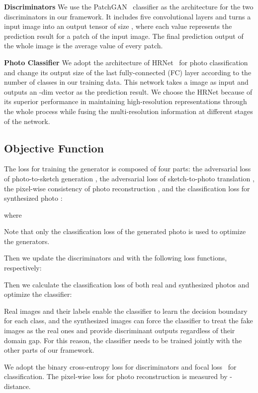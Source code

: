 \documentclass[10pt,twocolumn,letterpaper]{article}
\begin{document}
\noindent \textbf{Discriminators} We use the PatchGAN~\cite{li2016precomputed,ledig2017photo} classifier as the architecture for the two discriminators in our framework. It includes five convolutional layers and turns a  input image into an output tensor of size , where each value represents the prediction result for a  patch of the input image. The final prediction output of the whole image is the average value of every patch.

\noindent \textbf{Photo Classifier} We adopt the architecture of HRNet~\cite{wang2020deep} for photo classification and change its output size of the last fully-connected (FC) layer according to the number of classes in our training data. This network takes a  image as input and outputs an -dim vector as the prediction result. We choose the HRNet because of its superior performance in maintaining high-resolution representations through the whole process while fusing the multi-resolution information at different stages of the network.

\subsection{Objective Function} 
\label{sec:obj}
The loss for training the generator is composed of four parts: the adversarial loss of photo-to-sketch generation , the adversarial loss of sketch-to-photo translation , the pixel-wise consistency of photo reconstruction , and the classification loss for synthesized photo :


\noindent where 





Note that only the classification loss of the generated photo  is used to optimize the generators. 

Then we update the discriminators  and  with the following loss functions, respectively:



Then we calculate the classification loss of both real and synthesized photos and optimize the classifier:


Real images and their labels enable the classifier to learn the decision boundary for each class, and the synthesized images can force the classifier to treat the fake images as the real ones and provide discriminant outputs regardless of their domain gap. For this reason, the classifier needs to be trained jointly with the other parts of our framework.

We adopt the binary cross-entropy loss for discriminators and focal loss~\cite{lin2017focal} for classification. The pixel-wise loss for photo reconstruction is measured by -distance.
\end{document}
